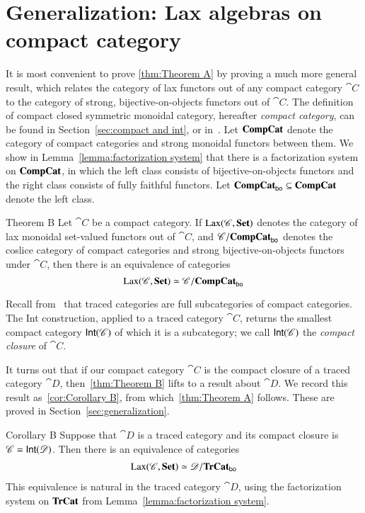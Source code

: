 \documentclass[12pt,oneside,article,draft]{memoir}
\begin{document}
\section{Generalization: Lax algebras on compact category}

It is most convenient to prove \ref{thm:Theorem A} by proving a much more general result, which relates the category of lax functors out of any compact category $\cat{C}$ to the category of strong, bijective-on-objects functors out of $\cat{C}$.
The definition of compact closed symmetric monoidal category, hereafter \emph{compact category}, can be found in Section~\ref{sec:compact and int}, or in~\cite{MacLane}.
Let $\mathbf{CompCat}$ denote the category of compact categories and strong monoidal functors between them.
We show in Lemma~\ref{lemma:factorization system} that there is a factorization system on $\mathbf{CompCat}$, in which the left class consists of bijective-on-objects functors and the right class consists of fully faithful functors.
Let $\mathbf{CompCat}_{\mathsf{bo}}\subseteq\mathbf{CompCat}$ denote the left class.

\begin{named}{Theorem B}
	Let $\cat{C}$ be a compact category.
	If $\operatorname{Lax}(\mathscr{C},\mathbf{Set})$ denotes the category of lax monoidal set-valued functors out of $\cat{C}$, and $\mathscr{C}/\mathbf{CompCat}_{\mathsf{bo}}$ denotes the coslice category of compact categories and strong bijective-on-objects functors under $\cat{C}$, then there is an equivalence of categories
	\begin{equation}\label{dia:compact lax strong}
		\operatorname{Lax}(\mathscr{C},\mathbf{Set})\simeq\mathscr{C}/\mathbf{CompCat}_{\mathsf{bo}}
	\end{equation}
\end{named}

Recall from~\cite{JoyalStreetVerity} that traced categories are full subcategories of compact categories.
The Int construction, applied to a traced category $\cat{C}$, returns the smallest compact category $\mathsf{Int}(\mathscr{C})$ of which it is a subcategory; we call $\mathsf{Int}(\mathscr{C})$ the \emph{compact closure} of $\cat{C}$. 

It turns out that if our compact category $\cat{C}$ is the compact closure of a traced category $\cat{D}$, then~\ref{thm:Theorem B} lifts to a result about $\cat{D}$.
We record this result as~\ref{cor:Corollary B}, from which~\ref{thm:Theorem A} follows.
These are proved in Section~\ref{sec:generalization}. 

\begin{named}{Corollary B}
	Suppose that $\cat{D}$ is a traced category and its compact closure is $\mathscr{C}=\mathsf{Int}(\mathscr{D})$.
	Then there is an equivalence of categories
	\begin{align}\label{dia:traced lax strong}
		\operatorname{Lax}(\mathscr{C},\mathbf{Set})\simeq\mathscr{D}/\mathbf{TrCat}_{\mathsf{bo}}
	\end{align}
	This equivalence is natural in the traced category $\cat{D}$, using the factorization system on $\mathbf{TrCat}$ from Lemma~\ref{lemma:factorization system}.
\end{named}
\end{document}
